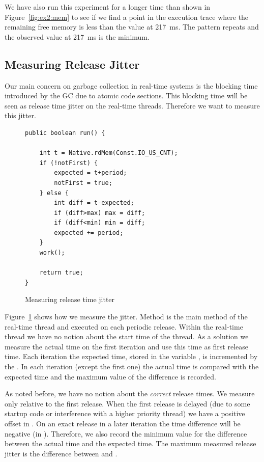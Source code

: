 We have also run this experiment for a longer time than shown in
Figure~\ref{fig:ex2:mem} to see if we find a point in the execution
trace where the remaining free memory is less than the value at
217~ms. The pattern repeats and the observed value at 217~ms is the
minimum.




\subsection{Measuring Release Jitter}

Our main concern on garbage collection in real-time systems is the
blocking time introduced  by the GC due to atomic code sections.
This blocking time will be seen as release time jitter on the
real-time threads. Therefore we want to measure this jitter.

\begin{figure}
{\small
\begin{verbatim}
public boolean run() {

    int t = Native.rdMem(Const.IO_US_CNT);
    if (!notFirst) {
        expected = t+period;
        notFirst = true;
    } else {
        int diff = t-expected;
        if (diff>max) max = diff;
        if (diff<min) min = diff;
        expected += period;
    }
    work();

    return true;
}
\end{verbatim} }
    \caption{Measuring release time jitter}
    \label{lst:measure}
\end{figure}

Figure~\ref{lst:measure} shows how we measure the jitter. Method
 is the main method of the real-time thread and executed
on each periodic release. Within the real-time thread we have no
notion about the start time of the thread. As a solution we measure
the actual time on the first iteration and use this time as first
release time. Each iteration the expected time, stored in the
variable , is incremented by the . In
each iteration (except the first one) the actual time is compared
with the expected time and the maximum value of the difference is
recorded.

As noted before, we have no notion about the \emph{correct} release
times. We measure only relative to the first release. When the first
release is delayed (due to some startup code or interference with a
higher priority thread) we have a positive offset in
. On an exact release in a later iteration the time
difference will be negative (in ). Therefore, we also
record the minimum value for the difference between the actual time
and the expected time. The maximum measured release jitter is the
difference between  and .

